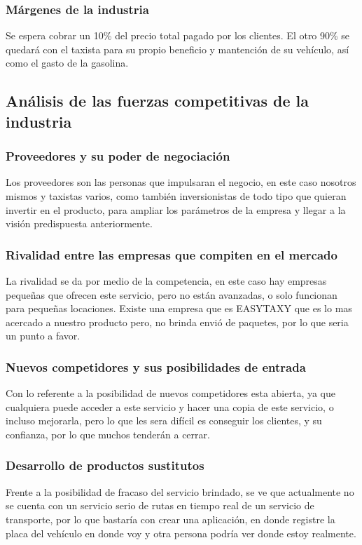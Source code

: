 \subsubsection{Márgenes de la industria}
Se espera cobrar un 10\% del precio total pagado por los clientes. El otro 90\% se quedará con el taxista para su propio beneficio y mantención de su vehículo, así como el gasto de la gasolina.


\subsection{Análisis de las fuerzas competitivas de la industria}

\subsubsection{Proveedores y su poder de negociación}
Los proveedores son las personas que impulsaran el negocio, en este caso nosotros mismos y taxistas varios, como también inversionistas de todo tipo que quieran invertir en el producto, para ampliar los parámetros de la empresa y llegar a la visión predispuesta anteriormente.

\subsubsection{Rivalidad entre las empresas que compiten en el mercado}
La rivalidad se da por medio de la competencia, en este caso hay empresas pequeñas que ofrecen este servicio, pero no están avanzadas, o solo funcionan para pequeñas locaciones. Existe una empresa que es EASYTAXY que es lo mas acercado a nuestro producto pero, no brinda envió de paquetes, por lo que seria un punto a favor.

\subsubsection{Nuevos competidores y sus posibilidades de entrada}
Con lo referente a la posibilidad de nuevos competidores esta abierta, ya que cualquiera puede acceder a este servicio y hacer una copia de este servicio, o incluso mejorarla, pero lo que les sera difícil es conseguir los clientes, y su confianza, por lo que muchos tenderán a cerrar.

\subsubsection{Desarrollo de productos sustitutos}
Frente a la posibilidad de fracaso del servicio brindado, se ve que  actualmente no se cuenta con un servicio serio de rutas en tiempo real de un servicio de transporte, por lo que bastaría con crear una aplicación, en donde  registre la placa del  vehículo en donde voy y otra persona podría ver donde estoy realmente.

